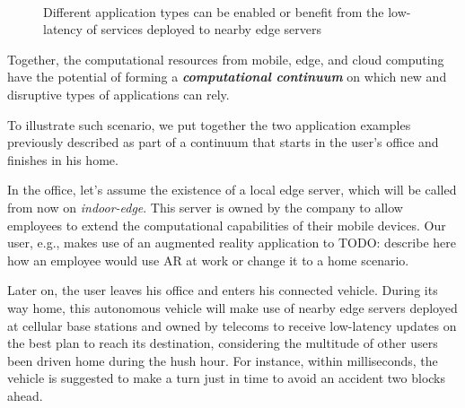 \begin{figure}[htbp]
	\centering
	\hfill
	~
	\hfill
	\caption{Different application types can be enabled or benefit from the low-latency of services deployed to nearby edge servers} \label{fig:motivational-cases}
\end{figure}

Together, the computational resources from mobile, edge, and cloud computing have the potential of forming a \textit{\textbf{computational continuum}} on which new and disruptive types of applications can rely. 

To illustrate such scenario, we put together the two application examples previously described as part of a continuum that starts in the user's office and finishes in his home. 

In the office, let's assume the existence of a local edge server, which will be called from now on \textit{indoor-edge}. This server is owned by the company to allow employees to extend the computational capabilities of their mobile devices. Our user, e.g., makes use of an augmented reality application to TODO: describe here how an employee would use AR at work or change it to a home scenario.

Later on, the user leaves his office and enters his connected vehicle. During its way home, this autonomous vehicle will make use of nearby edge servers deployed at cellular base stations and owned by telecoms to receive low-latency updates on the best plan to reach its destination, considering the multitude of other users been driven home during the hush hour. For instance, within milliseconds, the vehicle is suggested to make a turn just in time to avoid an accident two blocks ahead. 

